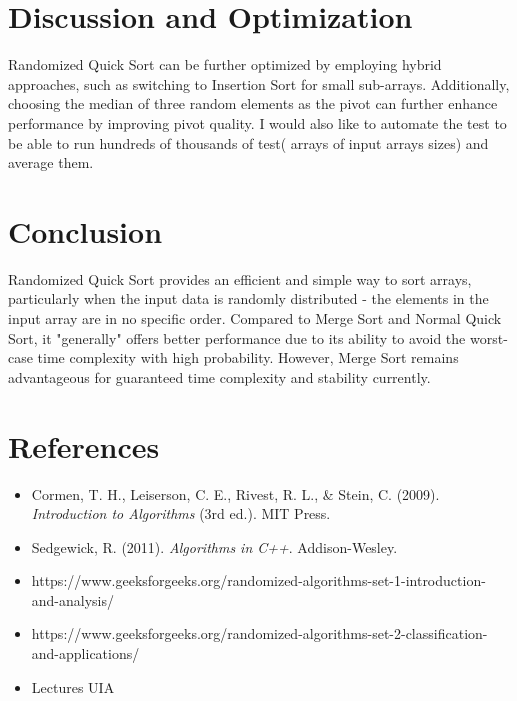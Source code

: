 \documentclass{article}
\begin{document}
\section{Discussion and Optimization}
Randomized Quick Sort can be further optimized by employing hybrid approaches, such as switching to Insertion Sort for small sub-arrays. Additionally, choosing the median of three random elements as the pivot can further enhance performance by improving pivot quality.
I would also like to automate the test to be able to run hundreds of thousands of test( arrays of input arrays sizes) and average them.

\section{Conclusion}
Randomized Quick Sort provides an efficient and simple way to sort arrays, particularly when the input data is randomly distributed - the elements in the input array are in no specific order. Compared to Merge Sort and Normal Quick Sort, it "generally" offers better performance due to its ability to avoid the worst-case time complexity with high probability. However, Merge Sort remains advantageous for guaranteed time complexity and stability currently.

\section*{References}
\begin{itemize}
    \item Cormen, T. H., Leiserson, C. E., Rivest, R. L., \& Stein, C. (2009). \textit{Introduction to Algorithms} (3rd ed.). MIT Press.
    \item Sedgewick, R. (2011). \textit{Algorithms in C++}. Addison-Wesley.
    \item https://www.geeksforgeeks.org/randomized-algorithms-set-1-introduction-and-analysis/
    \item https://www.geeksforgeeks.org/randomized-algorithms-set-2-classification-and-applications/
    \item Lectures UIA
\end{itemize}
\end{document}
